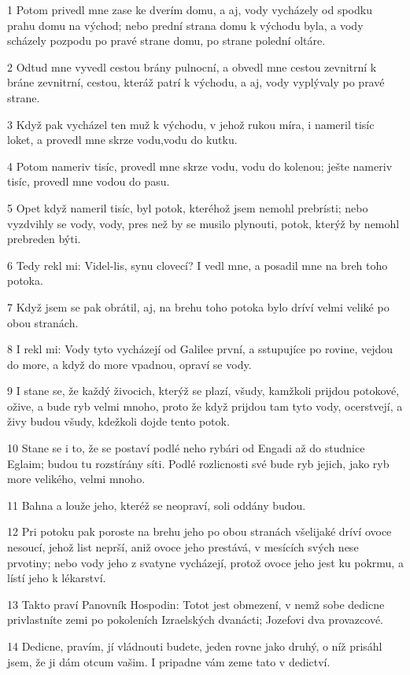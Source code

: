 \par 1 Potom privedl mne zase ke dverím domu, a aj, vody vycházely od spodku prahu domu na východ; nebo prední strana domu k východu byla, a vody scházely pozpodu po pravé strane domu, po strane polední oltáre.
\par 2 Odtud mne vyvedl cestou brány pulnocní, a obvedl mne cestou zevnitrní k bráne zevnitrní, cestou, kteráž patrí k východu, a aj, vody vyplývaly po pravé strane.
\par 3 Když pak vycházel ten muž k východu, v jehož rukou míra, i nameril tisíc loket, a provedl mne skrze vodu,vodu do kutku.
\par 4 Potom nameriv tisíc, provedl mne skrze vodu, vodu do kolenou; ješte nameriv tisíc, provedl mne vodou do pasu.
\par 5 Opet když nameril tisíc, byl potok, kteréhož jsem nemohl prebrísti; nebo vyzdvihly se vody, vody, pres než by se musilo plynouti, potok, kterýž by nemohl prebreden býti.
\par 6 Tedy rekl mi: Videl-lis, synu clovecí? I vedl mne, a posadil mne na breh toho potoka.
\par 7 Když jsem se pak obrátil, aj, na brehu toho potoka bylo dríví velmi veliké po obou stranách.
\par 8 I rekl mi: Vody tyto vycházejí od Galilee první, a sstupujíce po rovine, vejdou do more, a když do more vpadnou, opraví se vody.
\par 9 I stane se, že každý živocich, kterýž se plazí, všudy, kamžkoli prijdou potokové, ožive, a bude ryb velmi mnoho, proto že když prijdou tam tyto vody, ocerstvejí, a živy budou všudy, kdežkoli dojde tento potok.
\par 10 Stane se i to, že se postaví podlé neho rybári od Engadi až do studnice Eglaim; budou tu rozstírány síti. Podlé rozlicnosti své bude ryb jejich, jako ryb more velikého, velmi mnoho.
\par 11 Bahna a louže jeho, kteréž se neopraví, soli oddány budou.
\par 12 Pri potoku pak poroste na brehu jeho po obou stranách všelijaké dríví ovoce nesoucí, jehož list neprší, aniž ovoce jeho prestává, v mesících svých nese prvotiny; nebo vody jeho z svatyne vycházejí, protož ovoce jeho jest ku pokrmu, a lístí jeho k lékarství.
\par 13 Takto praví Panovník Hospodin: Totot jest obmezení, v nemž sobe dedicne privlastníte zemi po pokoleních Izraelských dvanácti; Jozefovi dva provazcové.
\par 14 Dedicne, pravím, jí vládnouti budete, jeden rovne jako druhý, o níž prisáhl jsem, že ji dám otcum vašim. I pripadne vám zeme tato v dedictví.
